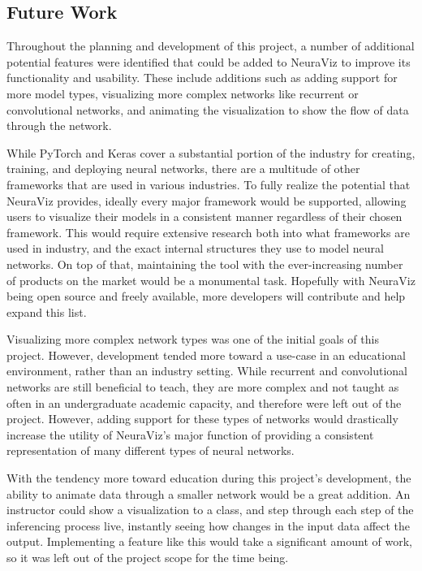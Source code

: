 \subsection{Future Work}
Throughout the planning and development of this project, a number of additional potential features were identified that could be added to NeuraViz to improve its functionality and usability. These include additions such as adding support for more model types, visualizing more complex networks like recurrent or convolutional networks, and animating the visualization to show the flow of data through the network.

While PyTorch and Keras cover a substantial portion of the industry for creating, training, and deploying neural networks, there are a multitude of other frameworks that are used in various industries. To fully realize the potential that NeuraViz provides, ideally every major framework would be supported, allowing users to visualize their models in a consistent manner regardless of their chosen framework. This would require extensive research both into what frameworks are used in industry, and the exact internal structures they use to model neural networks. On top of that, maintaining the tool with the ever-increasing number of products on the market would be a monumental task. Hopefully with NeuraViz being open source and freely available, more developers will contribute and help expand this list. 

Visualizing more complex network types was one of the initial goals of this project. However, development tended more toward a use-case in an educational environment, rather than an industry setting. While recurrent and convolutional networks are still beneficial to teach, they are more complex and not taught as often in an undergraduate academic capacity, and therefore were left out of the project. However, adding support for these types of networks would drastically increase the utility of NeuraViz's major function of providing a consistent representation of many different types of neural networks. 

With the tendency more toward education during this project's development, the ability to animate data through a smaller network would be a great addition. An instructor could show a visualization to a class, and step through each step of the inferencing process live, instantly seeing how changes in the input data affect the output. Implementing a feature like this would take a significant amount of work, so it was left out of the project scope for the time being.